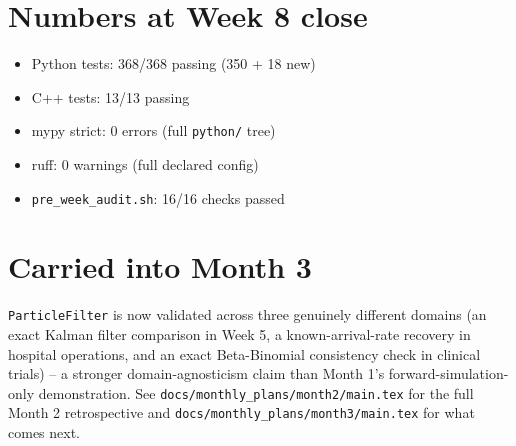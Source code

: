 \documentclass[11pt]{article}
\begin{document}
\section*{Numbers at Week 8 close}
\begin{itemize}[leftmargin=*]
  \item Python tests: 368/368 passing (350 + 18 new)
  \item C++ tests: 13/13 passing
  \item mypy strict: 0 errors (full \texttt{python/} tree)
  \item ruff: 0 warnings (full declared config)
  \item \texttt{pre\_week\_audit.sh}: 16/16 checks passed
\end{itemize}

\section*{Carried into Month 3}
\texttt{ParticleFilter} is now validated across three genuinely
different domains (an exact Kalman filter comparison in Week 5, a
known-arrival-rate recovery in hospital operations, and an exact
Beta-Binomial consistency check in clinical trials) -- a stronger
domain-agnosticism claim than Month 1's forward-simulation-only
demonstration. See \texttt{docs/monthly\_plans/month2/main.tex} for
the full Month 2 retrospective and
\texttt{docs/monthly\_plans/month3/main.tex} for what comes next.
\end{document}
